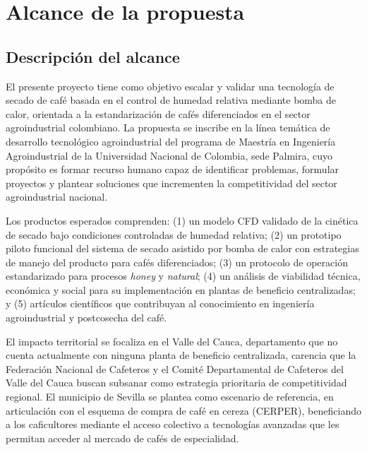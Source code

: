 \section{Alcance de la propuesta}

\subsection{Descripción del alcance}

El presente proyecto tiene como objetivo escalar y validar una tecnología de secado 
de café basada en el control de humedad relativa mediante bomba de calor, orientada 
a la estandarización de cafés diferenciados en el sector agroindustrial colombiano. 
La propuesta se inscribe en la línea temática de desarrollo tecnológico agroindustrial 
del programa de Maestría en Ingeniería Agroindustrial de la Universidad Nacional de 
Colombia, sede Palmira, cuyo propósito es formar recurso humano capaz de identificar 
problemas, formular proyectos y plantear soluciones que incrementen la competitividad 
del sector agroindustrial nacional.

Los productos esperados comprenden: (1) un modelo CFD validado de la cinética de 
secado bajo condiciones controladas de humedad relativa; (2) un prototipo piloto 
funcional del sistema de secado asistido por bomba de calor con estrategias de manejo 
del producto para cafés diferenciados; (3) un protocolo de operación estandarizado 
para procesos \textit{honey} y \textit{natural}; (4) un análisis de viabilidad 
técnica, económica y social para su implementación en plantas de beneficio 
centralizadas; y (5) artículos científicos que contribuyan al conocimiento en 
ingeniería agroindustrial y postcosecha del café.

El impacto territorial se focaliza en el Valle del Cauca, departamento que no cuenta 
actualmente con ninguna planta de beneficio centralizada, carencia que la Federación 
Nacional de Cafeteros y el Comité Departamental de Cafeteros del Valle del Cauca 
buscan subsanar como estrategia prioritaria de competitividad regional. El municipio de Sevilla se plantea como escenario de referencia, en articulación con 
el esquema de compra de café en cereza (CERPER), beneficiando a los caficultores 
mediante el acceso colectivo a tecnologías avanzadas que les permitan acceder al 
mercado de cafés de especialidad.

